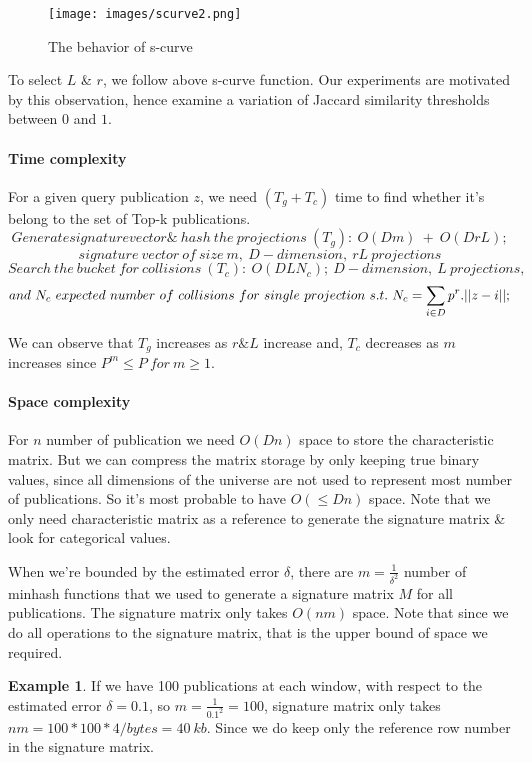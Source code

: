 \documentclass[a4paper,12pt,oneside]{book}
\theoremstyle{definition}
\newtheorem{example}{Example}[section]
\theoremstyle{remark}
\begin{document}
\begin{figure}[h]
\begin{center}
\texttt{[image: images/scurve2.png]}
\caption{The behavior of s-curve}
\label{img:scurve}
\end{center}
\end{figure}

To select $L$ \& $r$, we follow above s-curve function. Our experiments are motivated by this observation, hence examine a variation of Jaccard similarity thresholds between $0$ and $1$. 

\paragraph{Time complexity}
For a given query publication $z$, we need $(T_g+T_c)$ time to find whether it's belong to the set of Top-k publications.
\[ Generate signature vector \& \ hash\ the\ projections\ (T_g):\  O(Dm)\ +\ O(DrL);\] \[ signature\ vector\ of\ size\ m,\ D−dimension,\ rL\ projections \]
\[ Search\ the\ bucket\ for\ collisions\ (T_c):\ O(DLN_c);\  D-dimension,\ L\ projections, \]
\[ and\ N_c\ expected\ number\ of\ collisions\ for\ single\ projection\ \\ \ s.t.\ N_c=\sum_{i\in D} p^r.||z - i||; \]

We can observe that $T_g$ increases as $r \& L$ increase and, $T_c$ decreases as $m$ increases since $P^m \leq P\ for\ m \geq 1$.

\paragraph{Space complexity}
For $n$ number of publication we need $O(Dn)$ space to store the characteristic matrix. But we can compress the matrix storage by only keeping true binary values, since all dimensions of the universe are not used to represent most number of publications. So it's most probable to have $O( \leq Dn)$ space. Note that we only need characteristic matrix as a reference to generate the signature matrix \& look for categorical values.

When we're bounded by the estimated error $\delta$, there are $m=\frac{1}{\delta^2}$ number of minhash functions that we used to generate a signature matrix $M$ for all publications. The signature matrix only takes $O(nm)$ space. Note that since we do all operations to the signature matrix, that is the upper bound of space we required.

\begin{example}
If we have 100 publications at each window, with respect to the estimated error $\delta=0.1$, so $m=\frac{1}{0.1^2}=100$, signature matrix only takes $nm=100 * 100 * 4 / bytes=40\ kb$. Since we do keep only the reference row number in the signature matrix.
\end{example}
\end{document}
